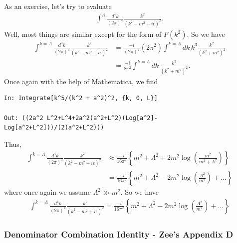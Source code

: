 \documentclass{book}
\theoremstyle{definition}
\newcommand{\f}[2]{\frac{#1}{#2}}
\newcommand{\lp}{\left(}
\newcommand{\rp}{\right)}
\newcommand{\lc}{\left\{}
\newcommand{\rc}{\right\}}
\begin{document}
As an exercise, let's try to evaluate
\begin{align}
\int^{\Lambda} \f{d^4k}{(2\pi)^4} \f{k^2}{(k^2 - m^2+ i\epsilon)^2}.
\end{align}
Well, most things are similar except for the  form of $F(k^2)$. So we have
\begin{align}
\int^{k=\Lambda} \f{d^4k}{(2\pi)^4} \f{k^2}{(k^2 - m^2+ i\epsilon)^2} &= \f{-i}{(2\pi)^4}(2\pi^2)\int^{k=\Lambda} dk\,k^3\f{k^2}{(k^2 + m^2)^2}\nonumber\\
&= \f{-i}{8\pi^2}\int^{k=\Lambda} dk\,\f{k^5}{(k^2 + m^2)^2}.
\end{align}
Once again with the help of Mathematica, we find 
\begin{lstlisting}
In: Integrate[k^5/(k^2 + a^2)^2, {k, 0, L}]

Out: ((2a^2 L^2+L^4+2a^2(a^2+L^2)(Log[a^2]-Log[a^2+L^2]))/(2(a^2+L^2)))
\end{lstlisting}
Thus,
\begin{align}
\int^{k=\Lambda} \f{d^4k}{(2\pi)^4} \f{k^2}{(k^2 - m^2+ i\epsilon)^2} &\approx \f{-i}{16\pi^2}\lc m^2 + \Lambda^2 + 2m^2\log\lp \f{m^2}{m^2 + \Lambda^2} \rp  \rc \nonumber\\
&= \f{-i}{16\pi^2}\lc m^2 + \Lambda^2 - 2m^2\log\lp \f{\Lambda^2}{m^2} \rp + \dots  \rc
\end{align}
where once again we assume $\Lambda^2 \gg m^2$. So we have
\begin{align}
\boxed{\int^{k=\Lambda} \f{d^4k}{(2\pi)^4} \f{k^2}{(k^2 - m^2+ i\epsilon)^2} = \f{-i}{16\pi^2}\lc m^2 + \Lambda^2 - 2m^2\log\lp \f{\Lambda^2}{m^2} \rp + \dots  \rc}
\end{align}




\subsubsection{Denominator Combination Identity - Zee's Appendix D}
\end{document}
